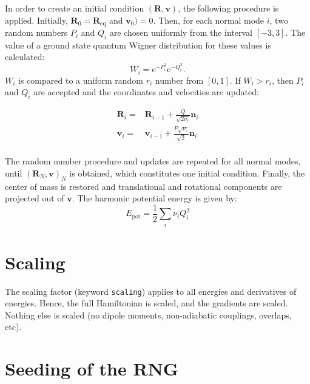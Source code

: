 \documentclass[a4paper,11pt,DIV=15,openany,twoside=false]{scrbook}
\newcommand{\tthdump}[1]{#1}
\newcommand{\ttt}[1]{\texttt{#1}}
\newcommand{\E}{\ensuremath{\mathrm{e}}}
\renewcommand{\vec}[1]{\ensuremath{\mathbf{#1}}}
\begin{document}
In order to create an initial condition $(\vec{R},\vec{v})$, the following procedure is applied. Initially, $\vec{R}_0=\vec{R}_{\text{eq}}$ and $\vec{v}_0)=0$. Then, for each normal mode $i$, two random numbers $P_i$ and $Q_i$ are chosen uniformly from the interval $[-3,3]$. The value of a ground state quantum Wigner distribution for these values is calculated:
\begin{equation}
  W_i=\E^{-P_i^2}\E^{-Q_i^2}.
\end{equation}
$W_i$ is compared to a uniform random $r_i$ number from $[0,1]$. If $W_i>r_i$, then $P_i$ and $Q_i$ are accepted and the coordinates and velocities are updated:
\tthdump{
  \begin{align}
    \vec{R}_i=&\vec{R}_{i-1} + \frac{Q}{\sqrt{2\nu_i}}\vec{n}_i\\
    \vec{v}_i=&\vec{v}_{i-1} + \frac{P\sqrt{\nu_i}}{\sqrt{2}}\vec{n}_i\\
  \end{align}
}
The random number procedure and updates are repeated for all normal modes, until $(\vec{R}_N,\vec{v})_N$ is obtained, which constitutes one initial condition. Finally, the center of mass is restored and translational and rotational components are projected out of $\vec{v}$. The harmonic potential energy is given by:
\begin{equation}
  E_{\text{pot}}=\frac{1}{2}\sum\limits_i \nu_iQ_i^2
\end{equation}


\section{Scaling}

The scaling factor (keyword \ttt{scaling}) applies to all energies and derivatives of energies. Hence, the full Hamiltonian is scaled, and the gradients are scaled. Nothing else is scaled (no dipole moments, non-adiabatic couplings, overlaps, etc).


\section{Seeding of the RNG}
\end{document}
